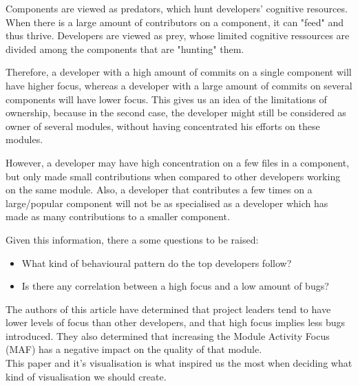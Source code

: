 Components are viewed as predators, which hunt developers' cognitive resources. When there is a large amount of contributors on a component, it can "feed" and thus thrive.
Developers are viewed as prey, whose limited cognitive ressources are divided among the components that are "hunting" them.

Therefore, a developer with a high amount of commits on a single component will have higher focus, whereas a developer with a large amount of commits on several components will have lower focus.
This gives us an idea of the limitations of ownership, because in the second case, the developer might still be considered as owner of several modules, without having concentrated his efforts on these modules.

However, a developer may have high concentration on a few files in a component, but only made small contributions when compared to other developers working on the same module.
Also, a developer that contributes a few times on a large/popular component will not be as specialised as a developer which has made as many contributions to a smaller component.

Given this information, there a some questions to be raised:
\begin{itemize}
\item What kind of behavioural pattern do the top developers follow?
\item Is there any correlation between a high focus and a low amount of bugs?
\end{itemize}

The authors of this article have determined that project leaders tend to have lower levels of focus than other developers, and that high focus implies less bugs introduced. They also determined that increasing the Module Activity Focus (MAF) has a negative impact on the quality of that module.\\

This paper and it's visualisation is what inspired us the most when deciding what kind of visualisation we should create.